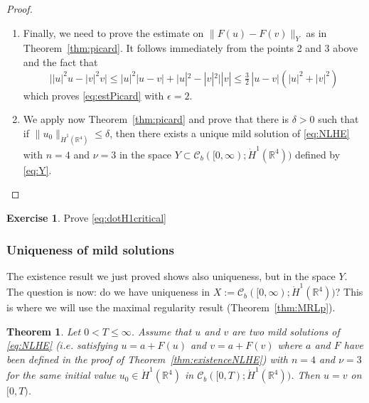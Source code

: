 \documentclass[a4paper, 12pt]{article}
\theoremstyle{plain}
\newtheorem{theorem}[proposition]{Theorem}
\theoremstyle{definition}
\newtheorem{exercise}{Exercise}
\theoremstyle{remark}
\numberwithin{equation}{section}
\begin{document}
\begin{proof}
\begin{enumerate}
\begin{align*}
\lesssim & t^{-\frac{1}{4}}\Bigl(\int_0^1\frac{1}{(1-\tau)^{\frac{3}{4}}\sqrt{\tau}}\,{\rm d}\tau\Bigr)\|u\|_Y^3, 
\end{align*}
%
which proves the claim.
\item
Finally, we need to prove the estimate on $\|F(u)-F(v)\|_Y$ as in Theorem~\ref{thm:picard}. It follows immediately from the points 2 and 3
above and the fact that 
%
\begin{equation}
\label{eq:fLip}
\bigl||u|^2u-|v|^2v\bigr|\le |u|^2|u-v|+\bigl|u|^2-|v|^2\bigr||v|\le \tfrac{3}{2}\,|u-v|(|u|^2+|v|^2)
\end{equation}
%
which proves \eqref{eq:estPicard} with $\epsilon=2$.
\item
We apply now Theorem~\ref{thm:picard} and prove that there is $\delta>0$ such that if $\|u_0\|_{\dot H^1({\mathds{R}}^4)}\le \delta$,
then there exists a unique mild solution of \eqref{eq:NLHE} with $n=4$ and $\nu=3$
in the space $Y\subset {\mathscr{C}}_b([0,\infty);\dot H^1({\mathds{R}}^4))$ defined by \eqref{eq:Y}.\qedhere
\end{enumerate}
\end{proof}

\begin{exercise}
Prove \eqref{eq:dotH1critical}
\end{exercise}

\subsubsection{Uniqueness of mild solutions}

The existence result we just proved shows also uniqueness, but in the space $Y$. The question is now: do we have uniqueness in 
$X:={\mathscr{C}}_b([0,\infty);\dot H^1({\mathds{R}}^4))$? This is where we will use the maximal regularity result (Theorem~\ref{thm:MRLp}).

\begin{theorem}
\label{thm:NLHEuniqueness}
Let $0<T\le \infty$.
Assume that $u$ and $v$ are two mild solutions of \eqref{eq:NLHE} ($i.e.$ satisfying $u=a+F(u)$ and $v=a+F(v)$ where $a$ and $F$ have 
been defined in the proof of Theorem~\ref{thm:existenceNLHE}) with $n=4$ and $\nu=3$ for the same initial value 
$u_0\in \dot H^1({\mathds{R}}^4)$ in ${\mathscr{C}}_b([0,T);\dot H^1({\mathds{R}}^4))$. Then $u=v$ on $[0,T)$.
\end{theorem}
\end{document}
